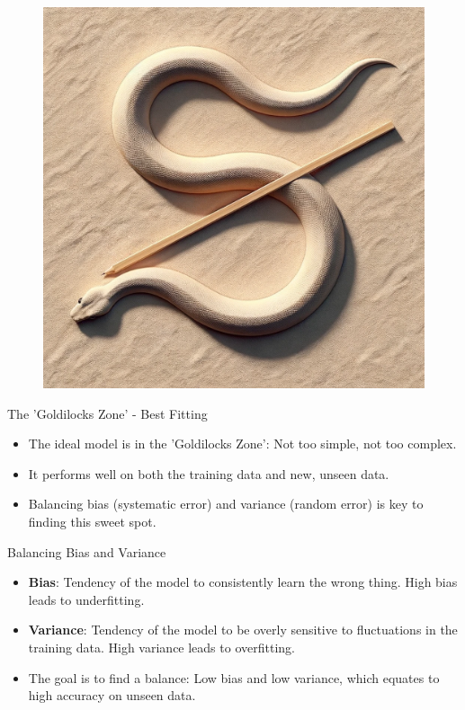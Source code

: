 \documentclass{beamer}
\begin{document}
\begin{frame}
  \begin{figure}
    \includegraphics[scale=0.25]{./lecture_includes/underfit_snake.png}
  \end{figure}
\end{frame}



\begin{frame}{The 'Goldilocks Zone' - Best Fitting}
\begin{itemize}
\item The ideal model is in the 'Goldilocks Zone': Not too simple, not too complex.
\item It performs well on both the training data and new, unseen data.
\item Balancing bias (systematic error) and variance (random error) is key to finding this sweet spot.
\end{itemize}
\end{frame}


\begin{frame}{Balancing Bias and Variance}
\begin{itemize}
\item \textbf{Bias}: Tendency of the model to consistently learn the wrong thing. High bias leads to underfitting.
\item \textbf{Variance}: Tendency of the model to be overly sensitive to fluctuations in the training data. High variance leads to overfitting.
\item The goal is to find a balance: Low bias and low variance, which equates to high accuracy on unseen data.
\end{itemize}
\end{frame}
\end{document}
